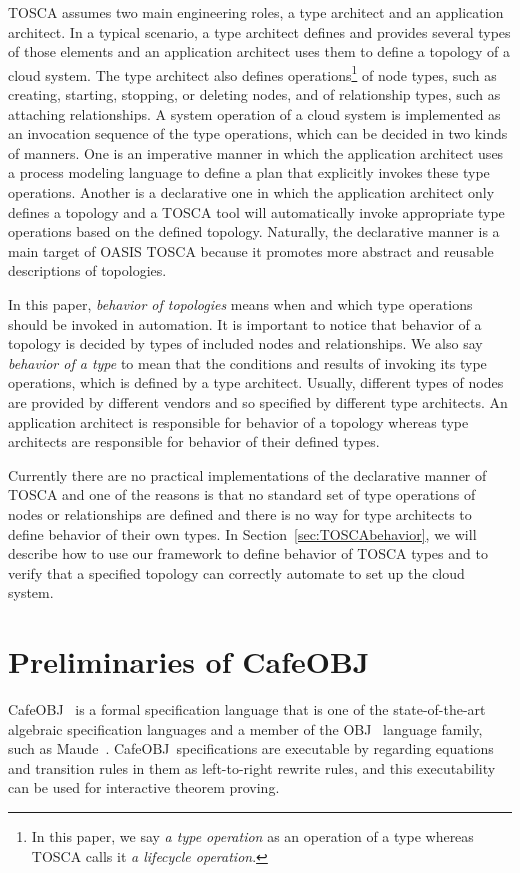 \documentclass[12pt]{report}
\newcommand{\cafeobj}{{\sf CafeOBJ}~}
\begin{document}
TOSCA assumes two main engineering roles, a type architect and an
application architect. In a typical scenario, a type architect defines
and provides several types of those elements and an application
architect uses them to define a topology of a cloud system. The
type architect also defines operations\footnote{In this paper, we say
  {\it a type operation} as an operation of a type whereas TOSCA calls
  it {\it a lifecycle operation}.} of node types, such as creating,
starting, stopping, or deleting nodes, and of relationship types, such
as attaching relationships. A system operation of a cloud system
is implemented as an invocation sequence of the type operations, which
can be decided in two kinds of manners. One is an imperative manner in
which the application architect uses a process modeling language to
define a plan that explicitly invokes these type operations. Another
is a declarative one in which the application architect only defines a
topology and a TOSCA tool will automatically invoke appropriate type
operations based on the defined topology. Naturally, the declarative
manner is a main target of OASIS TOSCA because it promotes more
abstract and reusable descriptions of topologies.

In this paper, {\it behavior of topologies} means when
and which type operations should be invoked in automation. It is
important to notice that behavior of a topology is decided by
types of included nodes and relationships. We also say
{\it behavior of a type} to mean that the conditions and
results of invoking its type operations, which is defined by a type
architect. Usually, different types of nodes are provided by different
vendors and so specified by different type architects. An application
architect is responsible for behavior of a topology
whereas type architects are responsible for behavior of
their defined types.

Currently there are no practical implementations of the declarative
manner of TOSCA and one of the reasons is that no standard set of type
operations of nodes or relationships are defined and there is no way
for type architects to define behavior of their own types.  In
Section~\ref{sec:TOSCAbehavior}, we will describe how to use our
framework to define behavior of TOSCA types and to verify that a
specified topology can correctly automate to set up the cloud system.

\chapter{Preliminaries of \cafeobj}
\label{chap:pre}
\cafeobj\cite{cafeobj} is a formal specification language that is one
of the state-of-the-art algebraic specification languages and a member
of the {\sf OBJ}~\cite{OBJ} language family, such as {\sf
  Maude}~\cite{Maude14}.  \cafeobj specifications are executable by
regarding equations and transition rules in them as left-to-right
rewrite rules, and this executability can be used for interactive
theorem proving.
\end{document}
